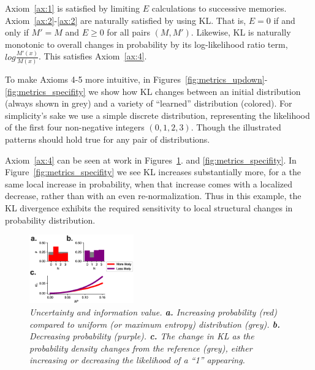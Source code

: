 \documentclass[9pt,twocolumn,twoside]{pnas-new}
\begin{document}
{Axiom~\ref{ax:1} is satisfied by limiting $E$ calculations to successive memories. Axiom~\ref{ax:2}-\ref{ax:2} are naturally satisfied by using KL. That is, $E = 0$ if and only if $M' = M$ and $E \geq 0$ for all pairs $(M, M')$. Likewise, KL is naturally monotonic to overall changes in probability by its log-likelihood ratio term, $log \frac{M'(x)}{M(x)}$. This satisfies Axiom~\ref{ax:4}. 


To make Axioms 4-5 more intuitive, in Figures~\ref{fig:metrics_updown}-\ref{fig:metrics_specifity} we show how KL changes between an initial distribution (always shown in grey) and a variety of ``learned'' distribution (colored). For simplicity's sake we use a simple discrete distribution, representing the likelihood of the first four non-negative integers $(0,1,2,3)$. Though the illustrated patterns should hold true for any pair of distributions.

Axiom~\ref{ax:4} can be seen at work in Figures~\ref{fig:metrics_likelihood}. and \ref{fig:metrics_specifity}. In Figure~\ref{fig:metrics_specifity} we see KL increases substantially more, for a the same local increase in probability, when that increase comes with a localized decrease, rather than with an even re-normalization. Thus in this example, the KL divergence exhibits the required sensitivity to local structural changes in probability distribution.

\begin{figure}
\includegraphics[width=0.4\textwidth]{figures/metrics_likelihood.eps}
\caption{
\textit{Uncertainty and information value.
\textbf{a.} Increasing probability (red) compared to uniform (or maximum entropy) distribution (grey).
\textbf{b.} Decreasing probability (purple).
\textbf{c.} The change in KL as the probability density changes from the reference (grey), either increasing or decreasing the likelihood of a ``1'' appearing.}}
\label{fig:metrics_likelihood}
\end{figure}

}
\end{document}
